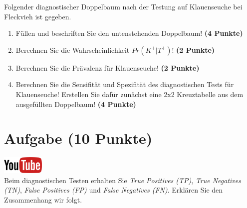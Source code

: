 \documentclass[a4paper, 10pt]{scrartcl}\usepackage[]{graphicx}\usepackage[]{xcolor}
\begin{document}
Folgender diagnostischer Doppelbaum nach der Testung auf Klauenseuche bei
Fleckvieh ist gegeben.

\begin{enumerate}
\item F{\"u}llen und beschriften Sie den untenstehenden Doppelbaum! \textbf{(4
    Punkte)}
\item Berechnen Sie die Wahrscheinlichkeit $Pr(K^+|T^+)$! \textbf{(2 Punkte)}
\item Berechnen Sie die Pr{\"a}valenz f{\"u}r Klauenseuche! \textbf{(2 Punkte)}
\item Berechnen Sie die Sensifit{\"a}t und Spezifit{\"a}t des diagnostischen Tests
  f{\"u}r Klauenseuche! Erstellen Sie daf{\"u}r zun{\"a}chst eine 2x2 Kreuztabelle aus
  dem ausgef{\"u}llten Doppelbaum!
  \textbf{(4 Punkte)}
\end{enumerate}

\vspace{1cm}
 




 
\clearpage

\section{Aufgabe \hfill (10 Punkte)}

\hfill\href{https://youtu.be/G-_r2KplGTI}{\includegraphics[width =
  2cm]{img/youtube}}\\[1Ex]


Beim diagnostischen Testen erhalten Sie \textit{True Positives (TP)},
\textit{True Negatives (TN)}, \textit{False Positives (FP)} und
\textit{False Negatives (FN)}. Erkl{\"a}ren Sie den Zusammenhang wir folgt.
\end{document}
